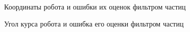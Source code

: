 \documentclass[14pt]{article}
\begin{document}
\begin{figure}
\noindent{}
\caption{Координаты робота и ошибки их оценок фильтром частиц}
\label{fig:pf_position}
\end{figure}

\begin{figure}
\noindent{}
\caption{Угол курса робота и  ошибка его оценки  фильтром частиц}
\label{fig:pf_heading}
\end{figure}

\clearpage
\end{document}
